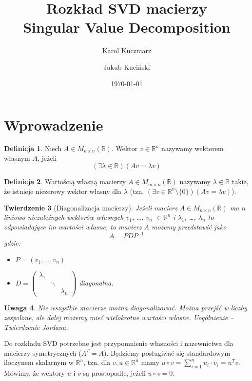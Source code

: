 \documentclass{article}
\title{Rozkład SVD macierzy \\ Singular Value Decomposition}
\author{Karol Kuczmarz \and Jakub Kuciński}
\date{\today}
\newtheorem{theorem}{Twierdzenie}[section]
\newtheorem{att}[theorem]{Uwaga}
\theoremstyle{definition}
\newtheorem{definition}[theorem]{Definicja}
\begin{document}
\maketitle
\section{Wprowadzenie}

\begin{definition}
Niech $A \in M_{n \times n}(\mathbb{R})$. Wektor $v \in \mathbb{R}^n$ nazywamy wektorem własnym $A$, jeżeli
$$ (\exists \lambda \in \mathbb{R}) (Av = \lambda v) $$
\end{definition}

\begin{definition}
Wartością własną macierzy $A \in M_{m \times n}(\mathbb{R})$ nazywamy $\lambda \in \mathbb{R}$ takie, że istnieje niezerowy wektor własny dla $\lambda$ (tzn. $(\exists v \in \mathbb{R}^n \setminus \{ 0 \} ) (Av=\lambda v) $). 
\end{definition}

\begin{theorem}[Diagonalizacja macierzy]
Jeżeli macierz $A \in M_{n \times n} (\mathbb{R})$ ma $n$ liniowo niezależnych wektorów własnych $v_1$, \ldots, $v_n$ $\in \mathbb{R}^n $ i $\lambda_1$, \ldots, $\lambda_n$ to odpowiadające im wartości własne, to macierz $A$ możemy przedstawić jako
$$ A = PDP^{-1} $$
gdzie:
\begin{itemize}
    \item $P = (v_1, \ldots, v_n)$
    \item $D = \begin{pmatrix} \lambda_1 & & \\ & \ddots & \\
     & & \lambda_n \end{pmatrix} $ diagonalna.
\end{itemize}
\end{theorem}

\begin{att}
Nie wszystkie macierze można diagonalizować. Można przejść w liczby zespolone, ale dalej możemy mieć wielokrotne wartości własne. Uogólnienie -- \textit{Twierdzenie Jordana}.
\end{att}

Do rozkładu SVD potrzebne jest przypomnienie własności i nazewnictwa dla macierzy symetrycznych ($A^T = A$). Będziemy posługiwać się standardowym iloczynem skalarnym w $\mathbb{R}^n$, tzn. dla $v,u \in \mathbb{R}^n$ mamy $u \circ v = \sum_{i=1}^n u_i \cdot v_i = u^Tv$. Mówimy, że wektory $u$ i $v$ są prostopadłe, jeżeli $u \circ v = 0$.
\end{document}
